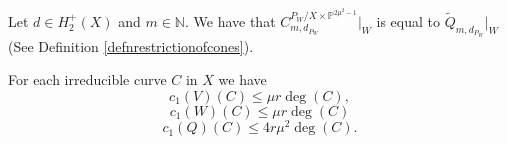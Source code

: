 \documentclass[10pt,a4paper]{amsart}
\newcommand{\bN}{\mathbb{N}}
\newcommand{\bP}{\mathbb{P}}
\renewcommand{\leq}{\leqslant}
\begin{document}
\begin{lemma} \label{lemmanormalconeforW0hd}
	Let $d \in H_2^+(X)$ and $m \in \bN$.
	We have that
	$C^{P_W/X \times \bP^{2\mu^2-1}}_{m,d_{P_W}}|_W$ is equal to
	$\widetilde{Q}_{m,d_{P_W}}|_W$ (See Definition \ref{defnrestrictionofcones}).
\end{lemma}

\begin{lemma} \label{lemmaboundsforfirstchernclasses}
	For each irreducible curve $C$ in $X$ we have
	\begin{equation} \label{chernclassinequality1}
		c_1(V)(C) \leq \mu r \deg(C),
	\end{equation}
	\begin{equation} \label{chernclassinequality2}
		c_1(W)(C) \leq \mu r \deg(C)
	\end{equation}
	\begin{equation} \label{chernclassinequality3}
		c_1(Q)(C) \leq 4r\mu^2 \deg(C).
	\end{equation}
\end{lemma}
\end{document}
